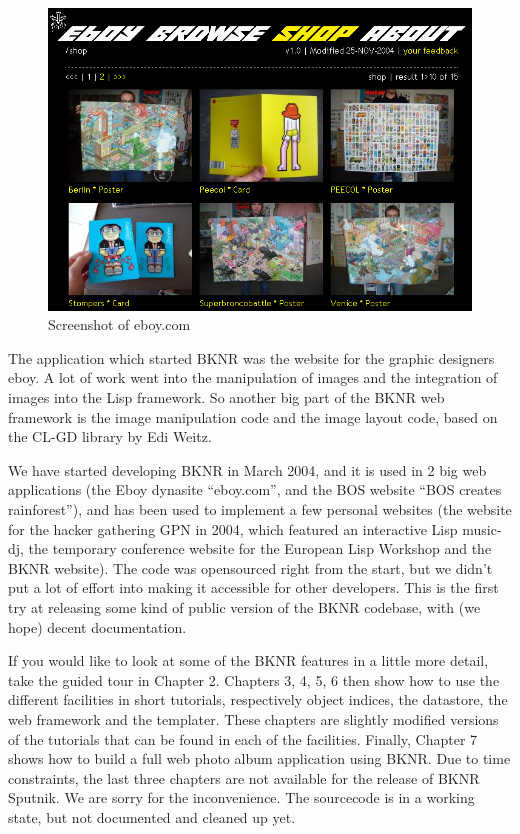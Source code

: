 \begin{figure}[htbp]
    \centering
\includegraphics[scale=0.4]{eboyshot1}
\caption{Screenshot of eboy.com}
\end{figure}

The application which started BKNR was the website for the graphic
designers eboy. A lot of work went into the manipulation of images and
the integration of images into the Lisp framework. So another big part
of the BKNR web framework is the image manipulation code and the image
layout code, based on the CL-GD library by Edi Weitz.

We have started developing BKNR in March 2004, and it is used in 2 big
web applications (the Eboy dynasite ``eboy.com'', and the BOS website
``BOS creates rainforest''), and has been used to implement a few
personal websites (the website for the hacker gathering GPN in 2004,
which featured an interactive Lisp music-dj, the temporary conference
website for the European Lisp Workshop and the BKNR website). The code
was opensourced right from the start, but we didn't put a lot of
effort into making it accessible for other developers. This is the
first try at releasing some kind of public version of the BKNR
codebase, with (we hope) decent documentation.

If you would like to look at some of the BKNR features in a little
more detail, take the guided tour in Chapter 2. Chapters 3, 4, 5, 6
then show how to use the different facilities in short tutorials,
respectively object indices, the datastore, the web framework and the
templater. These chapters are slightly modified versions of the
tutorials that can be found in each of the facilities. Finally,
Chapter 7 shows how to build a full web photo album application using
BKNR. Due to time constraints, the last three chapters are not
available for the release of BKNR Sputnik. We are sorry for the
inconvenience. The sourcecode is in a working state, but not
documented and cleaned up yet.

